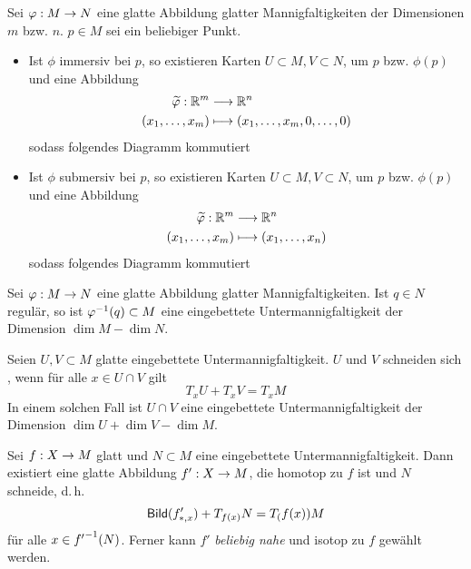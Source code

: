 \Prop{}
Sei $\varphi : M \overset{}{\rightarrow} N$ eine glatte Abbildung glatter Mannigfaltigkeiten der Dimensionen $m$ bzw. $n$. $p\in M$ sei ein beliebiger Punkt.
\begin{itemize}
	\item Ist $\phi$ immersiv bei $p$, so existieren Karten $U\subset M, V\subset N$, um $p$ bzw. $\phi(p)$ und eine Abbildung
	\begin{align*}
	\widetilde{\varphi} : \mathbb{R}^m& \overset{}{\longrightarrow} \mathbb{R}^n\\
	(x_1,\ldots, x_m) & \longmapsto (x_1,\ldots, x_m, 0,\ldots, 0)
	\end{align*}
	sodass folgendes Diagramm kommutiert
	\begin{center}
	\end{center}
	\item Ist $\phi$ submersiv bei $p$, so existieren Karten $U\subset M, V\subset N$, um $p$ bzw. $\phi(p)$ und eine Abbildung
\begin{align*}
\widetilde{\varphi} : \mathbb{R}^m& \overset{}{\longrightarrow} \mathbb{R}^n\\
(x_1,\ldots, x_m) & \longmapsto (x_1,\ldots, x_n)
\end{align*}
sodass folgendes Diagramm kommutiert
\begin{center}
\end{center}
\end{itemize}

\Kor{}
Sei $\varphi : M\overset{}{\rightarrow} N$ eine glatte Abbildung glatter Mannigfaltigkeiten. Ist $q\in N$ regulär, so ist $\varphi^{-1}(q)\subset M$ eine eingebettete Untermannigfaltigkeit der Dimension $\dim M - \dim N$.

\Satz{}
Seien $U,V \subset M$ glatte eingebettete Untermannigfaltigkeit. $U$ und $V$ schneiden sich , wenn für alle $x\in U\cap V$ gilt
\[ T_xU +T_xV = T_xM \]
In einem solchen Fall ist $U\cap V$ eine eingebettete Untermannigfaltigkeit der Dimension $\dim U + \dim V - \dim M$.

Sei $f : X \overset{}{\rightarrow} M$ glatt und $N\subset M$ eine eingebettete Untermannigfaltigkeit. Dann existiert eine glatte Abbildung $f' : X \overset{}{\rightarrow} M$, die homotop zu $f$ ist und $N$  schneide, d.\,h.
\[ \textsf{Bild} (f'_{*,x})  + T_{f(x)}N = T_(f(x))M \]
für alle $x \in {f'}^{-1}(N)$. Ferner kann $f'$ \textsl{beliebig nahe} und isotop zu $f$ gewählt werden.

